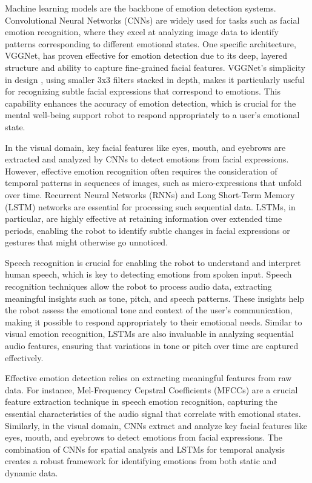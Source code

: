Machine learning models are the backbone of emotion detection systems. Convolutional Neural Networks (CNNs) \cite{computation11030052} are widely used for tasks such as facial emotion recognition, where they excel at analyzing image data to identify patterns corresponding to different emotional states. One specific architecture, VGGNet, has proven effective for emotion detection due to its deep, layered structure and ability to capture fine-grained facial features. VGGNet's simplicity in design \cite{computation11030052}, using smaller 3x3 filters stacked in depth, makes it particularly useful for recognizing subtle facial expressions that correspond to emotions. This capability enhances the accuracy of emotion detection, which is crucial for the mental well-being support robot to respond appropriately to a user's emotional state.

In the visual domain, key facial features like eyes, mouth, and eyebrows are extracted and analyzed by CNNs to detect emotions from facial expressions. However, effective emotion recognition often requires the consideration of temporal patterns in sequences of images, such as micro-expressions that unfold over time. Recurrent Neural Networks (RNNs) and Long Short-Term Memory (LSTM) \cite{schmidt2019} networks are essential for processing such sequential data. LSTMs, in particular, are highly effective at retaining information over extended time periods, enabling the robot to identify subtle changes in facial expressions or gestures that might otherwise go unnoticed.

Speech recognition is crucial for enabling the robot to understand and interpret human speech, which is key to detecting emotions from spoken input. Speech recognition techniques allow the robot to process audio data, extracting meaningful insights such as tone, pitch, and speech patterns. These insights help the robot assess the emotional tone and context of the user’s communication, making it possible to respond appropriately to their emotional needs. Similar to visual emotion recognition, LSTMs are also invaluable in analyzing sequential audio features, ensuring that variations in tone or pitch over time are captured effectively.

Effective emotion detection relies on extracting meaningful features from raw data. For instance, Mel-Frequency Cepstral Coefficients (MFCCs) \cite{singh2014} are a crucial feature extraction technique in speech emotion recognition, capturing the essential characteristics of the audio signal that correlate with emotional states. Similarly, in the visual domain, CNNs extract and analyze key facial features like eyes, mouth, and eyebrows to detect emotions from facial expressions. The combination of CNNs for spatial analysis and LSTMs for temporal analysis creates a robust framework for identifying emotions from both static and dynamic data.

